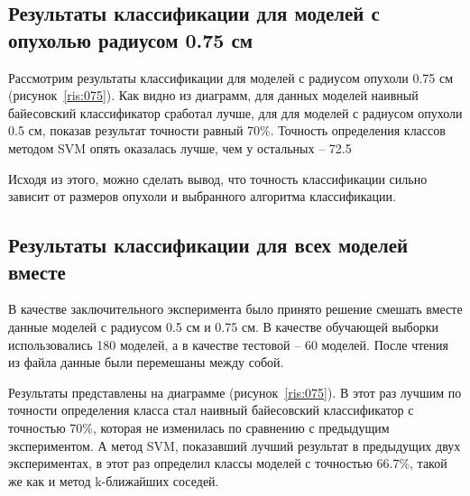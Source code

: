 \subsection{Результаты классификации для моделей с опухолью радиусом 0.75 см}
Рассмотрим результаты классификации для моделей с радиусом опухоли 0.75 см (рисунок~\ref{ris:075}). Как видно из диаграмм, для данных моделей наивный байесовский классификатор сработал лучше, для для моделей с радиусом опухоли 0.5 см, показав результат точности равный 70\%. Точность определения классов методом SVM опять оказалась лучше, чем у остальных -- 72.5%
\par
Исходя из этого, можно сделать вывод, что точность классификации сильно зависит от размеров опухоли и выбранного алгоритма классификации.


\subsection{Результаты классификации для всех моделей вместе}
В качестве заключительного эксперимента было принято решение смешать вместе данные моделей с радиусом 0.5 см и 0.75 см. В качестве обучающей выборки использовались 180 моделей, а в качестве тестовой -- 60 моделей. После чтения из файла данные были перемешаны между собой. 
\par
Результаты представлены на диаграмме (рисунок~\ref{ris:075}). В этот раз лучшим по точности определения класса стал наивный байесовский классификатор с точностью 70\%, которая не изменилась по сравнению с предыдущим экспериментом. А метод  SVM, показавший лучший результат в предыдущих двух экспериментах, в этот раз определил классы моделей с точностью 66.7\%, такой же как и метод k-ближайших соседей.


